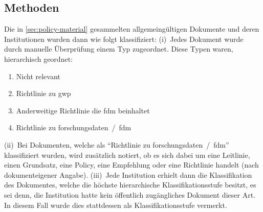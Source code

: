 \subsection{Methoden}\label{sec:policy-methods}
Die in \cref{sec:policy-material} gesammelten allgemeingültigen Dokumente und deren Institutionen wurden dann wie folgt klassifiziert:
(i)~Jedes Dokument wurde durch manuelle Überprüfung einem Typ zugeordnet.
Diese Typen waren, hierarchisch geordnet: 
\begin{enumerate}
    \item Nicht relevant
    \item Richtlinie zu \gls{gwp}
    \item Anderweitige Richtlinie die \gls{fdm} beinhaltet
    \item Richtlinie zu \gls{forschungsdaten}~/~\gls{fdm}
\end{enumerate}    
(ii)~Bei Dokumenten, welche als \enquote{Richtlinie zu \gls{forschungsdaten}~/~\gls{fdm}} klassifiziert wurden, wird zusätzlich notiert, ob es sich dabei um eine Leitlinie, einen Grundsatz, eine Policy, eine Empfehlung oder eine Richtlinie handelt (nach dokumenteigener Angabe).
(iii)~Jede Institution erhielt dann die Klassifikation des Dokumentes, welche die höchste hierarchische Klassifikationsstufe besitzt, es sei denn, die Institution hatte kein öffentlich zugängliches Dokument dieser Art.
In diesem Fall wurde dies stattdessen als Klassifikationsstufe vermerkt.

